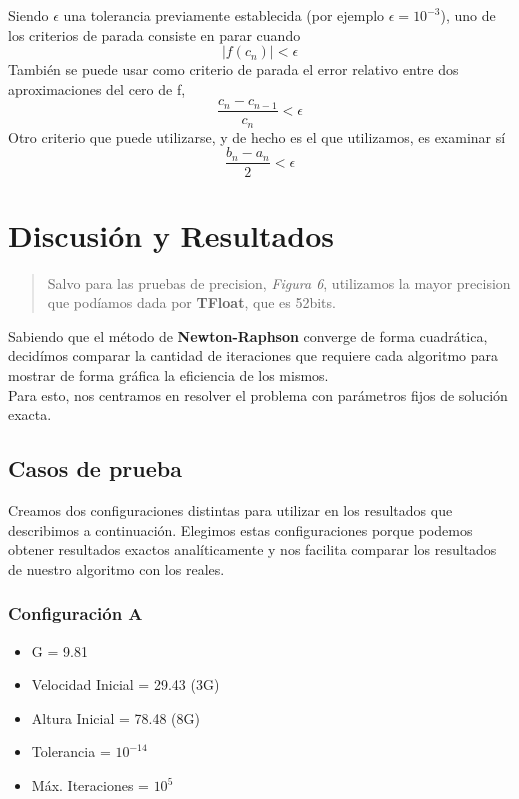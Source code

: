\documentclass[a4paper]{article}
\begin{document}
Siendo $\epsilon$ una tolerancia previamente establecida (por ejemplo $\epsilon = 10^{-3}$), uno de los criterios de parada consiste en parar cuando 
\begin{equation}|f(c_n)| < \epsilon \end{equation}
También se puede usar como criterio de parada el error relativo entre dos aproximaciones del cero de f, 
\begin{equation}\frac{c_n - c_{n-1}}{c_n} < \epsilon \end{equation}
Otro criterio que puede utilizarse, y de hecho es el que utilizamos, es examinar sí \begin{equation}\frac{b_n - a_n}{2} < \epsilon\end{equation}

\newpage
\section{Discusión y Resultados}
\begin{quote}
Salvo para las pruebas de precision, \textit{Figura 6}, utilizamos la mayor precision que podíamos dada por \textbf{TFloat}, que es 52bits.
\end{quote}
\vspace{1em}

Sabiendo que el método de \textbf{Newton-Raphson} converge de forma cuadrática, decidímos comparar la cantidad de iteraciones que requiere cada algoritmo para mostrar de forma gráfica la eficiencia de los mismos. \\

Para esto, nos centramos en resolver el problema con parámetros fijos de solución exacta.

\subsection{Casos de prueba}
 Creamos dos configuraciones distintas para utilizar en los resultados que describimos a continuación.
Elegimos estas configuraciones porque podemos obtener resultados exactos analíticamente y nos facilita comparar los resultados de nuestro algoritmo con los reales.

\subsubsection{Configuración A} 
\begin{itemize}
  \item{G = 9.81}
  \item{Velocidad Inicial = 29.43 (3G)} 
  \item{Altura Inicial = 78.48 (8G)} 
  \item{Tolerancia = $10^{-14}$} 
  \item{Máx. Iteraciones = $10^5$}
\end{itemize}
\end{document}

